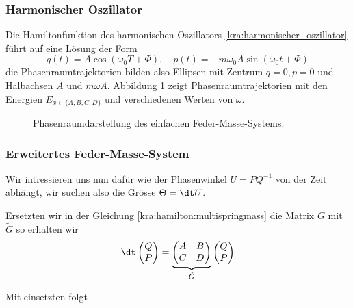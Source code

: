\subsubsection{Harmonischer Oszillator}
Die Hamiltonfunktion des harmonischen Oszillators \ref{kra:harmonischer_oszillator} führt auf eine Lösung der Form
\begin{equation*}
    q(t) = A \cos(\omega_0 T + \Phi), \quad p(t) = -m \omega_0 A \sin(\omega_0 t + \Phi)
\end{equation*}
die Phasenraumtrajektorien bilden also Ellipsen mit Zentrum $q=0, p=0$ und Halbachsen $A$ und $m \omega A$.
Abbildung \ref{kra:fig:phasenraum} zeigt Phasenraumtrajektorien mit den Energien $E_{x \in \{A, B, C, D\}}$ und verschiedenen Werten von $\omega$.

\begin{figure}
    
    \caption{Phasenraumdarstellung des einfachen Feder-Masse-Systems.}
    \label{kra:fig:phasenraum}
\end{figure}

\subsubsection{Erweitertes Feder-Masse-System}
Wir intressieren uns nun dafür wie der Phasenwinkel $U = PQ^{-1}$ von der Zeit abhängt,
wir suchen also die Grösse $\Theta = \dt U$.

Ersetzten wir in der Gleichung \ref{kra:hamilton:multispringmass} die Matrix $G$ mit $\tilde{G}$ so erhalten wir
\begin{equation}
    \dt
    \begin{pmatrix}
        Q \\
        P
    \end{pmatrix}
    =
    \underbrace{
        \begin{pmatrix}
            A & B \\
            C & D
        \end{pmatrix}
    }_{\tilde{G}}
    \begin{pmatrix}
        Q \\
        P
    \end{pmatrix}
\end{equation}

Mit einsetzten folgt


